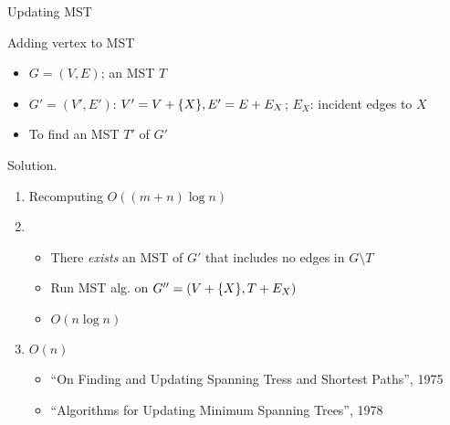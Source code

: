 \begin{frame}{Updating MST}
  \begin{exampleblock}{Adding vertex to MST }
    \begin{itemize}
      \item $G = (V,E)$; an MST $T$
      \item $G' = (V',E')$: $V' = V + \{X\}, E' = E + E_X$; $E_X$: incident
      edges to $X$
      \item To find an MST $T'$ of $G'$
    \end{itemize}
  \end{exampleblock}

  \begin{block}{Solution.}
    \begin{enumerate}
      \item Recomputing $O((m+n) \log n)$
      \item
        \begin{itemize}
          \item There \emph{exists} an MST of $G'$ that includes no edges in $G
          \setminus T$
          \item Run MST alg. on $G'' =(V + \{X\}, T + E_X)$
          \item $O(n \log n)$
        \end{itemize}
      \item $O(n)$
        \begin{itemize}
          \item ``On Finding and Updating Spanning Tress and Shortest Paths'', 1975
          \item ``Algorithms for Updating Minimum Spanning Trees'', 1978
        \end{itemize}
    \end{enumerate}
  \end{block}
\end{frame}


